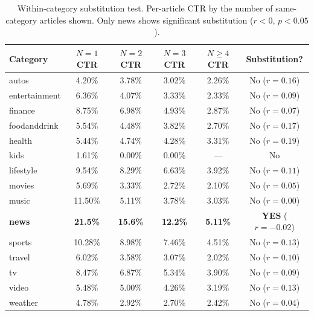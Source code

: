 \documentclass[11pt]{article}
\begin{document}
\begin{table}[ht]
\centering
\caption{Within-category substitution test. Per-article CTR by the number of same-category articles shown. Only news shows significant substitution ($r < 0$, $p < 0.05$).}
\label{tab:substitution}
\small
\begin{tabular}{lccccc}
\toprule
Category & $N{=}1$ CTR & $N{=}2$ CTR & $N{=}3$ CTR & $N{\geq}4$ CTR & Substitution? \\
\midrule
autos & 4.20\% & 3.78\% & 3.02\% & 2.26\% & No ($r{=}0.16$) \\
entertainment & 6.36\% & 4.07\% & 3.33\% & 2.33\% & No ($r{=}0.09$) \\
finance & 8.75\% & 6.98\% & 4.93\% & 2.87\% & No ($r{=}0.07$) \\
foodanddrink & 5.54\% & 4.48\% & 3.82\% & 2.70\% & No ($r{=}0.17$) \\
health & 5.44\% & 4.74\% & 4.28\% & 3.31\% & No ($r{=}0.19$) \\
kids & 1.61\% & 0.00\% & 0.00\% & --- & No \\
lifestyle & 9.54\% & 8.29\% & 6.63\% & 3.92\% & No ($r{=}0.11$) \\
movies & 5.69\% & 3.33\% & 2.72\% & 2.10\% & No ($r{=}0.05$) \\
music & 11.50\% & 5.11\% & 3.78\% & 3.03\% & No ($r{=}0.00$) \\
\textbf{news} & \textbf{21.5\%} & \textbf{15.6\%} & \textbf{12.2\%} & \textbf{5.11\%} & \textbf{YES} ($r{=}{-}0.02$) \\
sports & 10.28\% & 8.98\% & 7.46\% & 4.51\% & No ($r{=}0.13$) \\
travel & 6.02\% & 3.58\% & 3.07\% & 2.02\% & No ($r{=}0.10$) \\
tv & 8.47\% & 6.87\% & 5.34\% & 3.90\% & No ($r{=}0.09$) \\
video & 5.48\% & 5.00\% & 4.26\% & 3.19\% & No ($r{=}0.13$) \\
weather & 4.78\% & 2.92\% & 2.70\% & 2.42\% & No ($r{=}0.04$) \\
\bottomrule
\end{tabular}
\end{table}
\FloatBarrier
\end{document}
